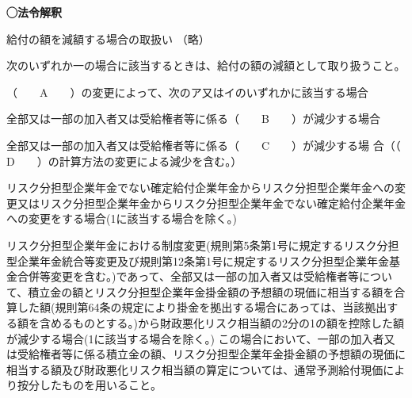 \begin{fillblank}[自作 \ 2026/10/10]

  \noindent \textbf{◯法令解釈}
  \begin{lawstructure}
    \begin{lawarticle}{}{}
      給付の額を減額する場合の取扱い
      （略）

      次のいずれか一の場合に該当するときは、給付の額の減額として取り扱うこと。

      （　　A　　）の変更によって、次のア又はイのいずれかに該当する場合

      全部又は一部の加入者又は受給権者等に係る（　　B　　）が減少する場合

      全部又は一部の加入者又は受給権者等に係る（　　C　　）が減少する場
      合（（　　D　　）の計算方法の変更による減少を含む。）

      リスク分担型企業年金でない確定給付企業年金からリスク分担型企業年金への変更又はリスク分担型企業年金からリスク分担型企業年金でない確定給付企業年金への変更をする場合(1に該当する場合を除く。)


      リスク分担型企業年金における制度変更(規則第5条第1号に規定するリスク分担型企業年金統合等変更及び規則第12条第1号に規定するリスク分担型企業年金基金合併等変更を含む。)であって、全部又は一部の加入者又は受給権者等について、積立金の額とリスク分担型企業年金掛金額の予想額の現価に相当する額を合算した額(規則第64条の規定により掛金を拠出する場合にあっては、当該拠出する額を含めるものとする。)から財政悪化リスク相当額の2分の1の額を控除した額が減少する場合(1に該当する場合を除く。) この場合において、一部の加入者又は受給権者等に係る積立金の額、リスク分担型企業年金掛金額の予想額の現価に相当する額及び財政悪化リスク相当額の算定については、通常予測給付現価により按分したものを用いること。


\end{lawarticle}
\end{lawstructure}
\end{fillblank}
